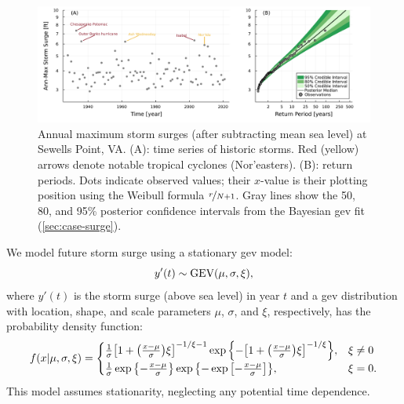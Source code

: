 \documentclass[11pt]{article}
\begin{document}
\begin{figure}
    \centering
    \includegraphics[width=\textwidth]{surge-obs-return}
    \caption{
        Annual maximum storm surges (after subtracting mean sea level) at Sewells Point, VA.
        (A):
        time series of historic storms.
        Red (yellow) arrows denote notable tropical cyclones (Nor'easters).
        (B):
        return periods.
        Dots indicate observed values; their $x$-value is their plotting position using the Weibull formula $\nicefrac{r}{N+1}$.
        Gray lines show the 50, 80, and 95\% posterior confidence intervals from the Bayesian \gls{gev} fit (\cref{sec:case-surge}).
    }\label{fig:surge-obs-return}
\end{figure}

We model future storm surge using a stationary \gls{gev} model:
\begin{equation}\label{eq:surge-model}
    y'(t) \sim \text{GEV}\qty(\mu, \sigma, \xi),
\end{equation}
where $y'(t)$ is the storm surge (above sea level) in year $t$ and a \gls{gev} distribution with location, shape, and scale parameters $\mu$, $\sigma$, and $\xi$, respectively, has the probability density function:
\begin{equation}\label{eq:gev-dist}
    f(x | \mu, \sigma, \xi)= \begin{cases}
        \frac{1}{\sigma} \qty[ 1 + \qty( \frac{x-\mu}{\sigma} ) \xi ]^{-1 / \xi - 1} \exp \qty{- \qty[1+\qty(\frac{x-\mu}{\sigma}) \xi ]^{-1 / \xi} }, & \xi \neq 0 \\
        \frac{1}{\sigma} \exp \qty{-\frac{x-\mu}{\sigma}} \exp \qty{ -\exp \qty[-\frac{x-\mu}{\sigma}]},                                               & \xi=0.
    \end{cases}
\end{equation}
This model assumes stationarity, neglecting any potential time dependence.
\end{document}
